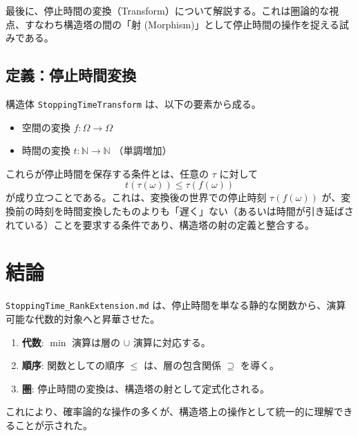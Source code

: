 \documentclass[a4paper,11pt]{ltjsarticle}
\theoremstyle{definition}
\newcommand{\N}{\mathbb{N}}
\newcommand{\OmegaSpace}{\Omega}
\newcommand{\Tau}{\tau}
\begin{document}
最後に、停止時間の変換（Transform）について解説する。これは圏論的な視点、すなわち構造塔の間の「射 (Morphism)」として停止時間の操作を捉える試みである。

\subsection{定義：停止時間変換}
構造体 \texttt{StoppingTimeTransform} は、以下の要素から成る。
\begin{itemize}
    \item 空間の変換 $f: \OmegaSpace \to \OmegaSpace$
    \item 時間の変換 $t: \N \to \N$ （単調増加）
\end{itemize}
これらが停止時間を保存する条件とは、任意の $\Tau$ に対して
\[
    t(\Tau(\omega)) \le \Tau(f(\omega))
\]
が成り立つことである。これは、変換後の世界での停止時刻 $\Tau(f(\omega))$ が、変換前の時刻を時間変換したものよりも「遅く」ない（あるいは時間が引き延ばされている）ことを要求する条件であり、構造塔の射の定義と整合する。

\section{結論}
\texttt{StoppingTime\_RankExtension.md} は、停止時間を単なる静的な関数から、演算可能な代数的対象へと昇華させた。
\begin{enumerate}
    \item \textbf{代数}: $\min$ 演算は層の $\cup$ 演算に対応する。
    \item \textbf{順序}: 関数としての順序 $\le$ は、層の包含関係 $\supseteq$ を導く。
    \item \textbf{圏}: 停止時間の変換は、構造塔の射として定式化される。
\end{enumerate}
これにより、確率論的な操作の多くが、構造塔上の操作として統一的に理解できることが示された。
\end{document}
